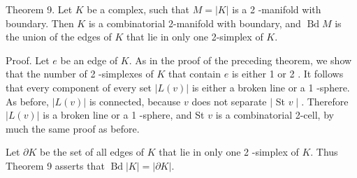 Theorem 9. Let $K$ be a complex, such that $M=|K|$ is a 2 -manifold with boundary. Then $K$ is a combinatorial 2-manifold with boundary, and $\operatorname{Bd} M$ is the union of the edges of $K$ that lie in only one 2-simplex of $K$.

Proof. Let $e$ be an edge of $K$. As in the proof of the preceding theorem, we show that the number of 2 -simplexes of $K$ that contain $e$ is either 1 or 2 . It follows that every component of every set $|L(v)|$ is either a broken line or a 1 -sphere. As before, $|L(v)|$ is connected, because $v$ does not separate $\mid$ St $v \mid$. Therefore $|L(v)|$ is a broken line or a 1 -sphere, and St $v$ is a combinatorial 2-cell, by much the same proof as before.

Let $\partial K$ be the set of all edges of $K$ that lie in only one 2 -simplex of $K$. Thus Theorem 9 asserts that $\operatorname{Bd}|K|=|\partial K|$.

